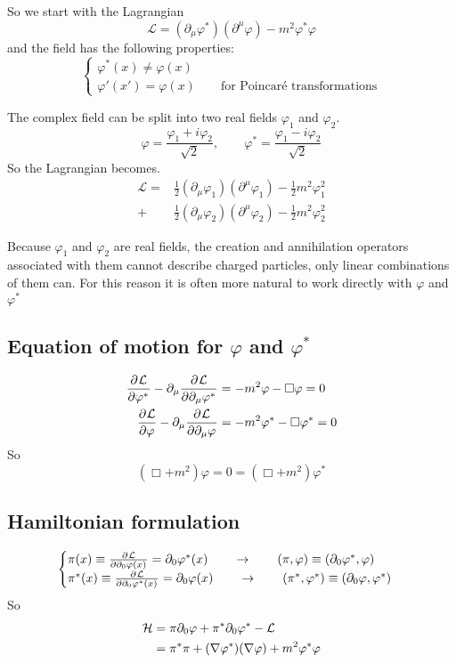 So we start with the Lagrangian
\[ \mathcal{L} = (\partial_\mu\varphi^*)(\partial^\mu\varphi) - m^2\varphi^*\varphi \]
and the field has the following properties:
\[ \begin{cases}
\varphi^*(x) \neq \varphi(x) \\
\varphi'(x') = \varphi(x) \qquad \text{for Poincaré transformations}
\end{cases} \]

The complex field can be split into two real fields $\varphi_1$ and $\varphi_2$.
\[ \varphi = \frac{\varphi_1+i\varphi_2}{\sqrt{2}}, \qquad \varphi^* = \frac{\varphi_1-i\varphi_2}{\sqrt{2}} \]
So the Lagrangian becomes.
\begin{align*}
\mathcal{L} = &\frac{1}{2}(\partial_\mu\varphi_1)(\partial^\mu\varphi_1) - \frac{1}{2}m^2\varphi^2_1 \\
 + &\frac{1}{2}(\partial_\mu\varphi_2)(\partial^\mu\varphi_2) - \frac{1}{2}m^2\varphi^2_2
 \end{align*}
 
 Because $\varphi_1$ and $\varphi_2$ are real fields, the creation and annihilation operators associated with them cannot describe charged particles, only linear combinations of them can. For this reason it is often more natural to work directly with $\varphi$ and $\varphi^*$

 \subsection{Equation of motion for $\varphi$ and $\varphi^*$}
 \begin{align*}
  \frac{\partial{^{}}\mathcal{L}}{\partial{{\varphi^*}^{}}}  - \partial_\mu  \frac{\partial{^{}}\mathcal{L}}{\partial{{\partial_\mu\varphi^*}^{}}}  &= -m^2\varphi-\Box\varphi = 0 \\
 \frac{\partial{^{}}\mathcal{L}}{\partial{{\varphi}^{}}}  - \partial_\mu  \frac{\partial{^{}}\mathcal{L}}{\partial{{\partial_\mu\varphi}^{}}}  &= -m^2\varphi^*-\Box\varphi^* = 0
 \end{align*}
 So
 \[ (\Box+m^2)\varphi = 0 = (\Box + m^2)\varphi^* \]

 \subsection{Hamiltonian formulation}
 \[ \begin{cases}
 \pi(x) \equiv  \frac{\partial{^{}}\mathcal{L}}{\partial{{\partial_0\varphi(x)}^{}}}   = \partial_0\varphi^*(x) \qquad \to \qquad (\pi, \varphi) \equiv (\partial_0\varphi^*,\varphi) \\
 \pi^*(x) \equiv  \frac{\partial{^{}}\mathcal{L}}{\partial{{\partial_0\varphi^*(x)}^{}}}  = \partial_0\varphi(x)\qquad \to \qquad (\pi^*, \varphi^*) \equiv (\partial_0\varphi,\varphi^*)
 \end{cases} \]
So
\[ \]
\begin{align*}
\mathcal{H} &= \pi\partial_0\varphi + \pi^*\partial_0\varphi^* - \mathcal{L} \\
&= \pi^*\pi + (\mathop{}\! \nabla\varphi^*)(\mathop{}\! \nabla\varphi) + m^2\varphi^*\varphi
\end{align*}



